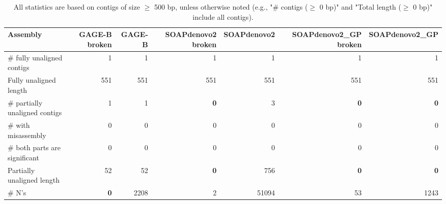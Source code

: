 \documentclass[12pt,a4paper]{article}
\begin{document}
\begin{table}[ht]
\begin{center}
\caption{All statistics are based on contigs of size $\geq$ 500 bp, unless otherwise noted (e.g., "\# contigs ($\geq$ 0 bp)" and "Total length ($\geq$ 0 bp)" include all contigs).}
\begin{tabular}{|l*{6}{|r}|}
\hline
Assembly & GAGE-B broken & GAGE-B & SOAPdenovo2 broken & SOAPdenovo2 & SOAPdenovo2\_GP broken & SOAPdenovo2\_GP \\ \hline
\# fully unaligned contigs & 1 & 1 & 1 & 1 & 1 & 1 \\ \hline
Fully unaligned length & 551 & 551 & 551 & 551 & 551 & 551 \\ \hline
\# partially unaligned contigs & 1 & 1 & {\bf 0} & 3 & {\bf 0} & {\bf 0} \\ \hline
\hspace{5mm}\# with misassembly & 0 & 0 & 0 & 0 & 0 & 0 \\ \hline
\hspace{5mm}\# both parts are significant & 0 & 0 & 0 & 0 & 0 & 0 \\ \hline
Partially unaligned length & 52 & 52 & {\bf 0} & 756 & {\bf 0} & {\bf 0} \\ \hline
\# N's & {\bf 0} & 2208 & 2 & 51094 & 53 & 1243 \\ \hline
\end{tabular}
\end{center}
\end{table}
\end{document}
